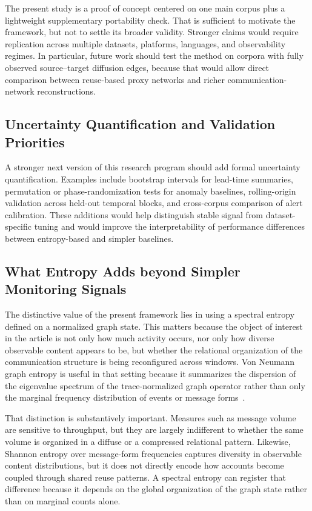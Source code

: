 \documentclass[sigconf]{acmart}
\begin{document}
The present study is a proof of concept centered on one main corpus plus a lightweight supplementary portability check. That is sufficient to motivate the framework, but not to settle its broader validity. Stronger claims would require replication across multiple datasets, platforms, languages, and observability regimes. In particular, future work should test the method on corpora with fully observed source--target diffusion edges, because that would allow direct comparison between reuse-based proxy networks and richer communication-network reconstructions.

\subsection{Uncertainty Quantification and Validation Priorities}

A stronger next version of this research program should add formal uncertainty quantification. Examples include bootstrap intervals for lead-time summaries, permutation or phase-randomization tests for anomaly baselines, rolling-origin validation across held-out temporal blocks, and cross-corpus comparison of alert calibration. These additions would help distinguish stable signal from dataset-specific tuning and would improve the interpretability of performance differences between entropy-based and simpler baselines.

\subsection{What Entropy Adds beyond Simpler Monitoring Signals}

The distinctive value of the present framework lies in using a spectral entropy defined on a normalized graph state. This matters because the object of interest in the article is not only how much activity occurs, nor only how diverse observable content appears to be, but whether the relational organization of the communication structure is being reconfigured across windows. Von Neumann graph entropy is useful in that setting because it summarizes the dispersion of the eigenvalue spectrum of the trace-normalized graph operator rather than only the marginal frequency distribution of events or message forms~\cite{braunstein2006,passerini2009,dedomenico2016}.

That distinction is substantively important. Measures such as message volume are sensitive to throughput, but they are largely indifferent to whether the same volume is organized in a diffuse or a compressed relational pattern. Likewise, Shannon entropy over message-form frequencies captures diversity in observable content distributions, but it does not directly encode how accounts become coupled through shared reuse patterns. A spectral entropy can register that difference because it depends on the global organization of the graph state rather than on marginal counts alone.
\end{document}

